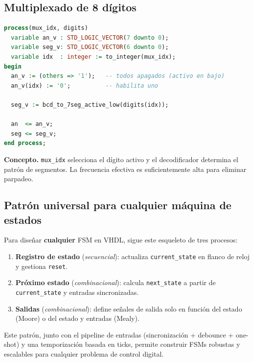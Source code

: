 \documentclass[a4paper,12pt]{article}
\begin{document}
\subsection{Multiplexado de 8 dígitos}

\begin{lstlisting}[language=VHDL, caption={Selección de dígito y actualización de ánodos/segmentos}, label={lst:mux-digitos}]
process(mux_idx, digits)
  variable an_v : STD_LOGIC_VECTOR(7 downto 0);
  variable seg_v: STD_LOGIC_VECTOR(6 downto 0);
  variable idx  : integer := to_integer(mux_idx);
begin
  an_v := (others => '1');   -- todos apagados (activo en bajo)
  an_v(idx) := '0';          -- habilita uno

  seg_v := bcd_to_7seg_active_low(digits(idx));

  an  <= an_v;
  seg <= seg_v;
end process;
\end{lstlisting}

\textbf{Concepto.} \texttt{mux\_idx} selecciona el dígito activo y el decodificador determina el patrón de segmentos. La frecuencia efectiva es suficientemente alta para eliminar parpadeo.




\subsection{Patrón universal para cualquier máquina de estados}

\noindent Para diseñar \textbf{cualquier} FSM en VHDL, sigue este esqueleto de tres procesos:
\begin{enumerate}
  \item \textbf{Registro de estado} (\emph{secuencial}): actualiza \texttt{current\_state} en flanco de reloj y gestiona \texttt{reset}.
  \item \textbf{Próximo estado} (\emph{combinacional}): calcula \texttt{next\_state} a partir de \texttt{current\_state} y entradas sincronizadas.
  \item \textbf{Salidas} (\emph{combinacional}): define señales de salida solo en función del estado (Moore) o del estado y entradas (Mealy).
\end{enumerate}

\noindent Este patrón, junto con el pipeline de entradas (sincronización + debounce + one-shot) y una temporización basada en ticks, permite construir FSMs robustas y escalables para cualquier problema de control digital.
\end{document}
